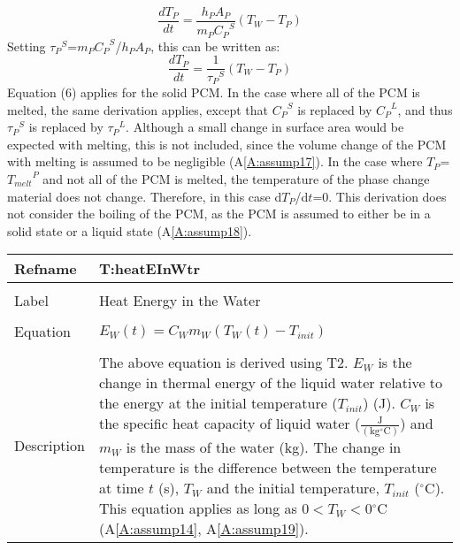 \documentclass[12pt]{article}
\begin{document}
\begin{dmath}
\frac{d {T_{P}}}{d t}=\frac{{h_{P}} {A_{P}}}{{m_{P}} {{C_{P}}^{S}}} \left({T_{W}}-{T_{P}}\right)
\end{dmath}
Setting ${{\tau{}_{P}}^{S}}$=${m_{P}}$${{C_{P}}^{S}}$/${h_{P}}$${A_{P}}$, this can be written as:
\begin{dmath}
\frac{d {T_{P}}}{d t}=\frac{1}{{{\tau{}_{P}}^{S}}} \left({T_{W}}-{T_{P}}\right)
\end{dmath}
Equation (6) applies for the solid PCM. In the case where all of the PCM is melted, the same derivation applies, except that ${{C_{P}}^{S}}$ is replaced by ${{C_{P}}^{L}}$, and thus ${{\tau{}_{P}}^{S}}$ is replaced by ${{\tau{}_{P}}^{L}}$. Although a small change in surface area would be expected with melting, this is not included, since the volume change of the PCM with melting is assumed to be negligible (A\ref{A:assump17}).
In the case where ${T_{P}}$=${{T_{melt}}^{P}}$ and not all of the PCM is melted, the temperature of the phase change material does not change. Therefore, in this case d${T_{P}}$/d$t$=0.
This derivation does not consider the boiling of the PCM, as the PCM is assumed to either be in a solid state or a liquid state (A\ref{A:assump18}).
~\newline
\noindent \begin{minipage}{\textwidth}
\begin{tabular}{p{} p{}}
\toprule \textbf{Refname} & \textbf{T:heatEInWtr}
\label{T:heatEInWtr}
\\ \midrule \\
Label & Heat Energy in the Water
\\ \midrule \\
Equation & ${E_{W}}\left(t\right)={C_{W}} {m_{W}} \left({T_{W}}\left(t\right)-{T_{init}}\right)$
\\ \midrule \\
Description & The above equation is derived using T2. ${E_{W}}$ is the change in thermal energy of the liquid water relative to the energy at the initial temperature (${T_{init}}$) (J). ${C_{W}}$ is the specific heat capacity of liquid water ($\frac{\text{J}}{(\text{kg}{}^{\circ}\text{C})}$) and ${m_{W}}$ is the mass of the water (kg). The change in temperature is the difference between the temperature at time $t$ (s), ${T_{W}}$ and the initial temperature, ${T_{init}}$ (${}^{\circ}$C). This equation applies as long as $0<{T_{W}}<0$${}^{\circ}$C (A\ref{A:assump14}, A\ref{A:assump19}).
\\ \bottomrule \end{tabular}
\end{minipage}\\
\end{document}
